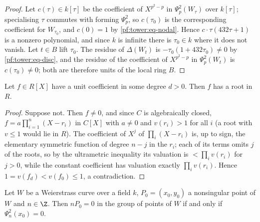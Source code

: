 \begin{proof}
Let $c(\tau)\in k[\tau]$ be the coefficient of $X^{p^2-p}$ in $\Psi_p^2(W_\tau)$ over $k[\tau]$; specialising
$\tau$ commutes with forming $\Psi_p^2$, so $c(\tau_0)$ is the corresponding coefficient for $W_{\tau_0}$, and
$c(0)=1$ by \eqref{pf:tower:eq-nodal}. Hence $c\cdot\tau(432\tau+1)$ is a nonzero polynomial, and since $k$ is
infinite there is $\tau_0\in k$ where it does not vanish. Let $t\in B$ lift $\tau_0$. The residue of
$\Delta(W_t)$ is $-\tau_0(1+432\tau_0)\ne0$ by \eqref{pf:tower:eq-disc}, and the residue of the coefficient of
$X^{p^2-p}$ in $\Psi_p^2(W_t)$ is $c(\tau_0)\ne0$; both are therefore units of the local ring $B$.
\end{proof}

\begin{lemma}\label{pf:tower:root}
Let $f\in R[X]$ have a unit coefficient in some degree $d>0$. Then $f$ has a root in $R$.
\end{lemma}

\begin{proof}
Suppose not. Then $f\ne0$, and since $C$ is algebraically closed, $f=a\prod_{i=1}^n(X-r_i)$ in $C[X]$ with
$a\ne0$ and $v(r_i)>1$ for all $i$ (a root with $v\le1$ would lie in $R$). The coefficient of $X^j$ of
$\prod_i(X-r_i)$ is, up to sign, the elementary symmetric function of degree $n-j$ in the $r_i$; each of its
terms omits $j$ of the roots, so by the ultrametric inequality its valuation is $<\prod_iv(r_i)$ for $j>0$,
while the constant coefficient has valuation exactly $\prod_iv(r_i)$. Hence $1=v(f_d)<v(f_0)\le1$, a
contradiction.
\end{proof}

\begin{lemma}\label{pf:tower:divpts}
Let $W$ be a Weierstrass curve over a field $k$, $P_0=(x_0,y_0)$ a nonsingular point of $W$ and $n\in\Z$. Then $nP_0=0$ in the
group of points of $W$ if and only if $\Psi_n^2(x_0)=0$.
\end{lemma}

